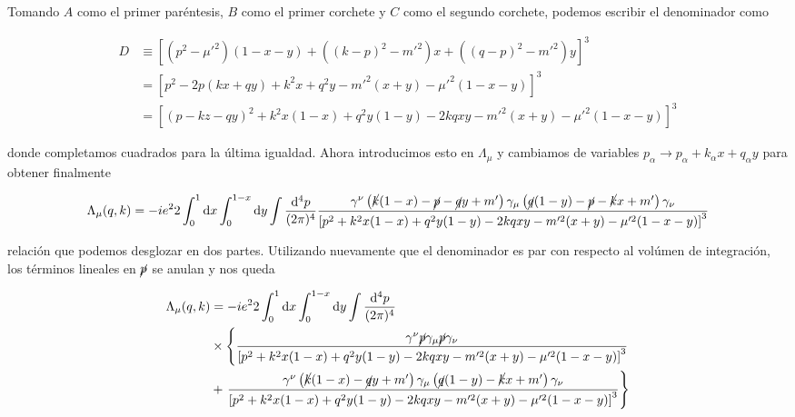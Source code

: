 \documentclass[tickz]{article}
\numberwithin{equation}{section}
\begin{document}
Tomando $ A $ como el primer paréntesis, $ B $ como el primer corchete y $ C $ como el segundo corchete, podemos escribir el denominador como

\begin{equation}\label{key}
\begin{aligned}
D &\equiv \left[(p^2-\mu'^2)(1-x-y) + ((k-p)^2-m'^2)x + ((q-p)^2-m'^2)y\right]^3\\
&= \left[p^2 -2p(kx+qy) + k^2x +q^2y -m'^2(x+y) -\mu'^2(1-x-y)\right]^3\\
&=\left[(p-kz-qy)^2 + k^2x(1-x) +q^2y(1-y) -2kqxy -m'^2(x+y) -\mu'^2(1-x-y)\right]^3
\end{aligned}
\end{equation}

donde completamos cuadrados para la última igualdad. Ahora introducimos esto en $ \Lambda_{\mu} $ y cambiamos de variables $ p_{\alpha} \longrightarrow p_{\alpha} + k_{\alpha}x + q_{\alpha}y $ para obtener finalmente

\begin{equation}
\Lambda_{\mu}(q,k)=-ie^22\int_0^1\mathrm{d}x\int_0^{1-x}\mathrm{d}y \int \frac{\mathrm{d^4}p}{(2\pi)^4} \frac{  \gamma^{\nu}\left(\cancel{k}(1-x)-\cancel{p} -\cancel{q}y+m'\right)\gamma_{\mu}\left( \cancel{q}(1-y)-\cancel{p} -\cancel{k}x +m'\right)\gamma_{\nu}}{\left[p^2 + k^2x(1-x) +q^2y(1-y) -2kqxy -m'^2(x+y) -\mu'^2(1-x-y)\right]^3}
\end{equation}

relación que podemos desglozar en dos partes. Utilizando nuevamente que el denominador es par con respecto al volúmen de integración, los términos lineales en $ \cancel{p} $ se anulan y nos queda


\begin{boxquation}
\begin{equation}\label{lambda}
\begin{aligned}
\Lambda_{\mu}(q,k)&=-ie^22\int_0^1\mathrm{d}x\int_0^{1-x}\mathrm{d}y \int \frac{\mathrm{d^4}p}{(2\pi)^4}\\
&\times \left\{ \frac{  \gamma^{\nu}\cancel{p}\gamma_{\mu}\cancel{p}\gamma_{\nu}}{\left[p^2 + k^2x(1-x) +q^2y(1-y) -2kqxy -m'^2(x+y) -\mu'^2(1-x-y)\right]^3} \right.\\
&+ \left. \frac{  \gamma^{\nu}\left(\cancel{k}(1-x) -\cancel{q}y+m'\right)\gamma_{\mu}\left( \cancel{q}(1-y) -\cancel{k}x +m'\right)\gamma_{\nu}}{\left[p^2 + k^2x(1-x) +q^2y(1-y) -2kqxy -m'^2(x+y) -\mu'^2(1-x-y)\right]^3} \right\}\\
\end{aligned}
\end{equation}
\end{boxquation}
\end{document}
